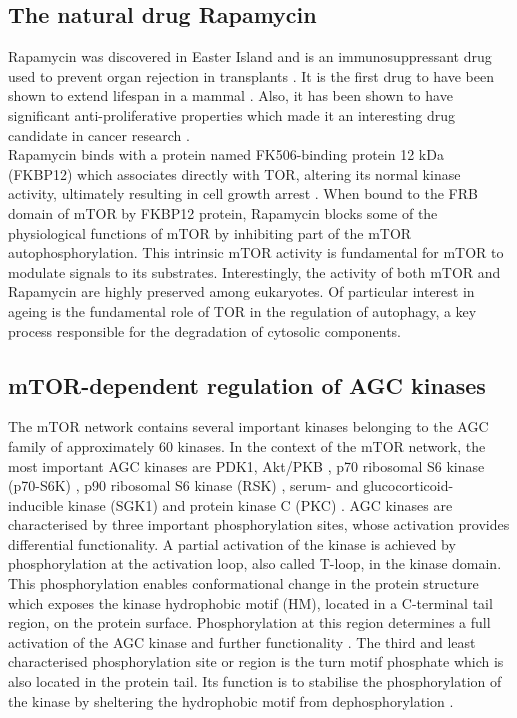 \subsection{The natural drug Rapamycin}
\label{subsec:The natural drug Rapamycin}
Rapamycin was discovered in Easter Island and is an immunosuppressant drug used to prevent organ rejection in transplants \citep{Saunders2001}. It is the first drug to have been shown to extend lifespan in a mammal \citep{Harrison2009}. Also, it has been shown to have significant anti-proliferative properties which made it an interesting drug candidate in cancer research \citep{Rao2004, Vignot2005}.\\
Rapamycin binds with a protein named FK506-binding protein 12 kDa (FKBP12) \citep{Choi1996} which associates directly with TOR, altering its normal kinase activity, ultimately resulting in cell growth arrest \citep{Evans2010}. When bound to the FRB domain of mTOR by FKBP12 protein, Rapamycin blocks some of the physiological functions of mTOR by inhibiting part of the mTOR autophosphorylation. This intrinsic mTOR activity is fundamental for mTOR to modulate signals to its substrates. Interestingly, the activity of both mTOR and Rapamycin are highly preserved among eukaryotes. Of particular interest in ageing is the fundamental role of TOR in the regulation of autophagy, a key process responsible for the degradation of cytosolic components.

\subsection{mTOR-dependent regulation of AGC kinases}
\label{subsec:mTOR-dependent regulation of AGC kinases}
The mTOR network contains several important kinases belonging to the AGC family of approximately 60 kinases. In the context of the mTOR network, the most important AGC kinases are PDK1, Akt/PKB \citep{Alessi2004, Alessi2004b}, p70 ribosomal S6 kinase (p70-S6K) \citep{Volarevic2001}, p90 ribosomal S6 kinase (RSK) \citep{williams2000}, serum- and glucocorticoid- inducible kinase (SGK1) \citep{Jacinto2008} and protein kinase C (PKC) \citep{Newton2003}. AGC kinases are characterised by three important phosphorylation sites, whose activation provides differential functionality. A partial activation of the kinase is achieved by phosphorylation at the activation loop, also called T-loop, in the kinase domain. This phosphorylation enables conformational change in the protein structure which exposes the kinase hydrophobic motif (HM), located in a C-terminal tail region, on the protein surface. Phosphorylation at this region determines a full activation of the AGC kinase and further functionality \citep{Pearce2010}. 
The third and least characterised phosphorylation site or region is the turn motif phosphate which is also located in the protein tail. Its function is to stabilise the phosphorylation of the kinase by sheltering the hydrophobic motif from dephosphorylation \citep{Hauge2007, Pearce2010}.\\

